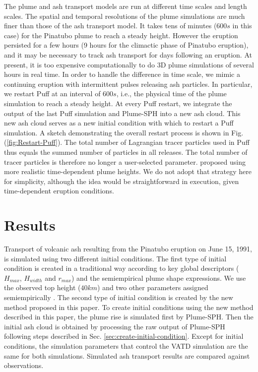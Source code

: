 \documentclass[utf8]{frontiersSCNS} %
\begin{document}
The plume and ash transport models are run at different time scales and length scales. The spatial and temporal resolutions of the plume simulations are much finer than those of the ash transport model. It takes tens of minutes ($600 s$ in this case) for the Pinatubo plume to reach a steady height. However the eruption persisted for a few hours (9 hours for the climactic phase of Pinatubo eruption), and it may be necessary to track ash transport for days following an eruption. At present, it is too expensive computationally to do 3D plume simulations of several hours in real time. In order to handle the difference in time scale, we mimic a continuing eruption with intermittent pulses releasing ash particles. In particular, we restart Puff at an interval of $600 s$, i.e., the physical time of the plume simulation to reach a steady height. At every Puff restart, we integrate the output of the last Puff simulation and Plume-SPH into a new ash cloud. This new ash cloud serves as a new initial condition with which to restart a Puff simulation. A sketch demonstrating the overall restart process is shown in Fig. (\ref{fig:Restart-Puff}). The total number of Lagrangian tracer particles used in Puff thus equals the summed number of particles in all releases. The total number of tracer particles is therefore no longer a user-selected parameter.  \citet{fero2008simulation} proposed using more realistic time-dependent plume heights. We do not adopt that strategy here for simplicity, although the idea would be straightforward in execution, given time-dependent eruption conditions.

\section{Results}

Transport of volcanic ash resulting from the Pinatubo eruption on June 15, 1991, is simulated using two different initial conditions.
The first type of initial condition is created in a traditional way according to key global descriptors ($H_{max}$, $H_{width}$ and $r_{max}$) and the semiempirical plume shape expressions. We use the observed top height ($40 km$) and two other parameters assigned semiempirically \citep{bursik2012estimation}. The second type of initial condition is created by the new method proposed in this paper. To create initial conditions using the new method described in this paper, the plume rise is simulated first by Plume-SPH. Then the initial ash cloud is obtained by processing the raw output of Plume-SPH following steps described in Sec. \ref{sec:create-initial-condition}. Except for initial conditions, the simulation parameters that control the VATD simulation are the same for both simulations. Simulated ash transport results are compared against observations.
\end{document}
